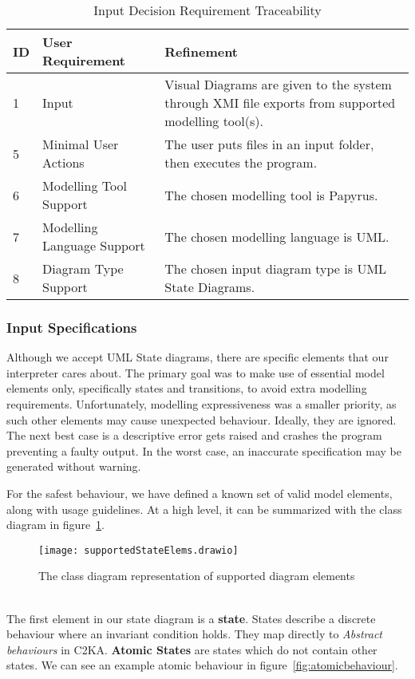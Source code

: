 \begin{table}[htbp]
\centering
\caption{Input Decision Requirement Traceability}\label{tab:input-table}
\begin{tabularx}{\textwidth}{| l | l | X |}
    \hline
    \textbf{ID} & \textbf{User Requirement} & \textbf{Refinement} \\
    \hline
    1 & Input & Visual Diagrams are given to the system through XMI file exports from supported modelling tool(s). \\ \hline
    5 & Minimal User Actions & The user puts files in an input folder, then executes the program.  \\ \hline
    6 & Modelling Tool Support & The chosen modelling tool is Papyrus. \\ \hline
    7 & Modelling Language Support & The chosen modelling language is UML. \\ \hline
    8 & Diagram Type Support & The chosen input diagram type is UML State Diagrams. \\ \hline
\end{tabularx}
\end{table}

\newpage
\subsubsection{Input Specifications}\label{subsubsec:input-specification}
Although we accept UML State diagrams, there are specific elements that our interpreter cares about.
The primary goal was to make use of essential model elements only, specifically states and transitions,
to avoid extra modelling requirements.
Unfortunately, modelling expressiveness was a smaller priority, as such
other elements may cause unexpected behaviour.
Ideally, they are ignored.
The next best case is a descriptive error gets raised and crashes the program preventing a faulty output.
In the worst case, an inaccurate specification may be generated without warning.

For the safest behaviour, we have defined a known set of valid model elements, along with usage guidelines.
At a high level, it can be summarized with the class diagram in figure~\ref{fig:supportedElems}.
\begin{figure}[h]
          \centering
          \texttt{[image: supportedStateElems.drawio]}
          \caption{The class diagram representation of supported diagram elements}
          \label{fig:supportedElems}
\end{figure}
\\
The first element in our state diagram is a \textbf{state}.
States describe a discrete behaviour where an invariant condition holds.
They map directly to \textit{Abstract behaviours} in C2KA\@.
\textbf{Atomic States} are states which do not contain other states.
We can see an example atomic behaviour in figure~\ref{fig:atomicbehaviour}.

